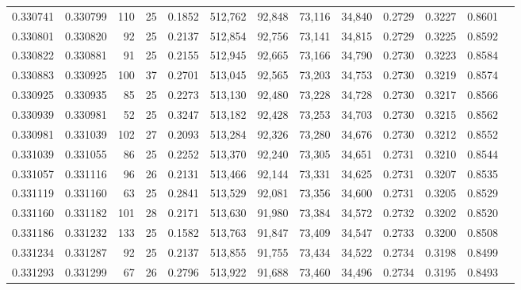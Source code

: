 \begin{tabular}{rrrrrrrrrrrrr}
0.330741 & 0.330799 &   110 &  25 &                                     0.1852 & 512,762 &  92,848 &  73,116 &  34,840 & 0.2729 & 0.3227 & 0.8601 \\
0.330801 & 0.330820 &    92 &  25 &                                     0.2137 & 512,854 &  92,756 &  73,141 &  34,815 & 0.2729 & 0.3225 & 0.8592 \\
0.330822 & 0.330881 &    91 &  25 &                                     0.2155 & 512,945 &  92,665 &  73,166 &  34,790 & 0.2730 & 0.3223 & 0.8584 \\
0.330883 & 0.330925 &   100 &  37 &                                     0.2701 & 513,045 &  92,565 &  73,203 &  34,753 & 0.2730 & 0.3219 & 0.8574 \\
0.330925 & 0.330935 &    85 &  25 &                                     0.2273 & 513,130 &  92,480 &  73,228 &  34,728 & 0.2730 & 0.3217 & 0.8566 \\
0.330939 & 0.330981 &    52 &  25 &                                     0.3247 & 513,182 &  92,428 &  73,253 &  34,703 & 0.2730 & 0.3215 & 0.8562 \\
0.330981 & 0.331039 &   102 &  27 &                                     0.2093 & 513,284 &  92,326 &  73,280 &  34,676 & 0.2730 & 0.3212 & 0.8552 \\
0.331039 & 0.331055 &    86 &  25 &                                     0.2252 & 513,370 &  92,240 &  73,305 &  34,651 & 0.2731 & 0.3210 & 0.8544 \\
0.331057 & 0.331116 &    96 &  26 &                                     0.2131 & 513,466 &  92,144 &  73,331 &  34,625 & 0.2731 & 0.3207 & 0.8535 \\
0.331119 & 0.331160 &    63 &  25 &                                     0.2841 & 513,529 &  92,081 &  73,356 &  34,600 & 0.2731 & 0.3205 & 0.8529 \\
0.331160 & 0.331182 &   101 &  28 &                                     0.2171 & 513,630 &  91,980 &  73,384 &  34,572 & 0.2732 & 0.3202 & 0.8520 \\
0.331186 & 0.331232 &   133 &  25 &                                     0.1582 & 513,763 &  91,847 &  73,409 &  34,547 & 0.2733 & 0.3200 & 0.8508 \\
0.331234 & 0.331287 &    92 &  25 &                                     0.2137 & 513,855 &  91,755 &  73,434 &  34,522 & 0.2734 & 0.3198 & 0.8499 \\
0.331293 & 0.331299 &    67 &  26 &                                     0.2796 & 513,922 &  91,688 &  73,460 &  34,496 & 0.2734 & 0.3195 & 0.8493 \\

\end{tabular}
